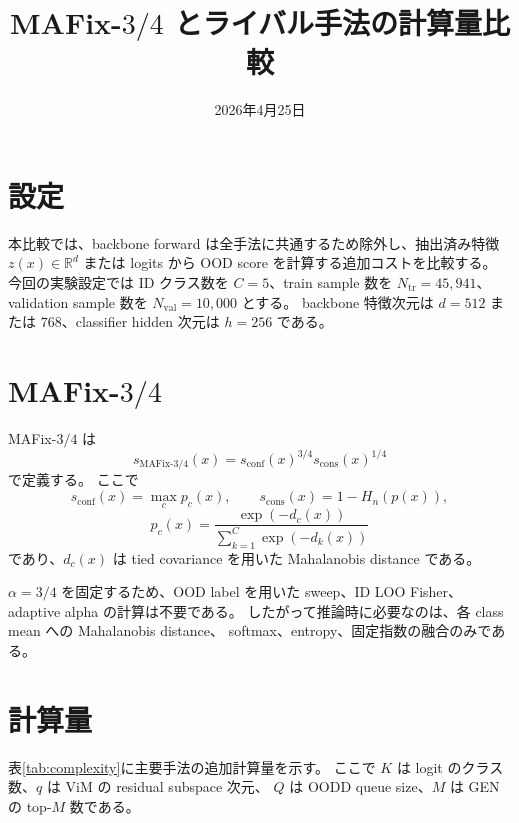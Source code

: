 \documentclass[a4paper,11pt]{ltjsarticle}
\title{MAFix-$3/4$ とライバル手法の計算量比較}
\author{}
\date{2026年4月25日}
\begin{document}
\maketitle

\section{設定}

本比較では、backbone forward は全手法に共通するため除外し、抽出済み特徴
$z(x)\in\mathbb{R}^{d}$ または logits から OOD score を計算する追加コストを比較する。
今回の実験設定では ID クラス数を $C=5$、train sample 数を
$N_{\mathrm{tr}}=45{,}941$、validation sample 数を
$N_{\mathrm{val}}=10{,}000$ とする。
backbone 特徴次元は $d=512$ または $768$、classifier hidden 次元は
$h=256$ である。

\section{MAFix-$3/4$}

MAFix-$3/4$ は
\begin{equation}
    s_{\mathrm{MAFix}\text{-}3/4}(x)
    =
    s_{\mathrm{conf}}(x)^{3/4}
    s_{\mathrm{cons}}(x)^{1/4}
\end{equation}
で定義する。
ここで
\begin{equation}
    s_{\mathrm{conf}}(x)=\max_c p_c(x),
    \qquad
    s_{\mathrm{cons}}(x)=1-H_n(p(x)),
\end{equation}
\begin{equation}
    p_c(x)
    =
    \frac{\exp(-d_c(x))}
         {\sum_{k=1}^{C}\exp(-d_k(x))}
\end{equation}
であり、$d_c(x)$ は tied covariance を用いた Mahalanobis distance である。

$\alpha=3/4$ を固定するため、OOD label を用いた sweep、ID LOO Fisher、
adaptive alpha の計算は不要である。
したがって推論時に必要なのは、各 class mean への Mahalanobis distance、
softmax、entropy、固定指数の融合のみである。

\section{計算量}

表\ref{tab:complexity}に主要手法の追加計算量を示す。
ここで $K$ は logit のクラス数、$q$ は ViM の residual subspace 次元、
$Q$ は OODD queue size、$M$ は GEN の top-$M$ 数である。
\end{document}
